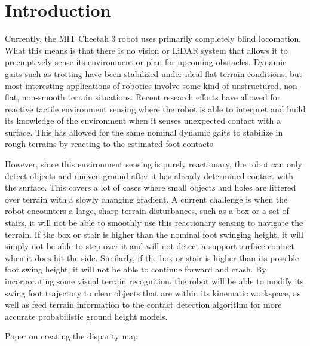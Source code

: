 
\section{Introduction}

Currently, the MIT Cheetah 3 robot uses primarily completely blind locomotion. What this means is that there is no vision or LiDAR system that allows it to preemptively sense its environment or plan for upcoming obstacles. Dynamic gaits such as trotting have been stabilized under ideal flat-terrain conditions, but most interesting applications of robotics involve some kind of unstructured, non-flat, non-smooth terrain situations. Recent research efforts have allowed for reactive tactile environment sensing where the robot is able to interpret and build its knowledge of the environment when it senses unexpected contact with a surface. This has allowed for the same nominal dynamic gaits to stabilize in rough terrains by reacting to the estimated foot contacts. 

However, since this environment sensing is purely reactionary, the robot can only detect objects and uneven ground after it has already determined contact with the surface. This covers a lot of cases where small objects and holes are littered over terrain with a slowly changing gradient. A current challenge is when the robot encounters a large, sharp terrain disturbances, such as a box or a set of stairs, it will not be able to smoothly use this reactionary sensing to navigate the terrain. If the box or stair is higher than the nominal foot swinging height, it will simply not be able to step over it and will not detect a support surface contact when it does hit the side. Similarly, if the box or stair is higher than its possible foot swing height, it will not be able to continue forward and crash. By incorporating some visual terrain recognition, the robot will be able to modify its swing foot trajectory to clear objects that are within its kinematic workspace, as well as feed terrain information to the contact detection algorithm for more accurate probabilistic ground height models.


Paper on creating the disparity map \cite{1467526} 